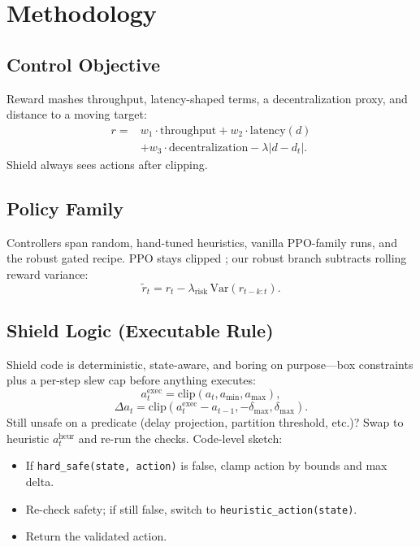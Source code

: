 \section{Methodology}

\subsection{Control Objective}

Reward mashes throughput, latency-shaped terms, a decentralization proxy, and distance to a moving target:
\[
\begin{aligned}
r ={}& w_1 \cdot \text{throughput} + w_2 \cdot \text{latency}(d) \\
&+ w_3 \cdot \text{decentralization} - \lambda |d - d_t|.
\end{aligned}
\]
Shield always sees actions after clipping.

\subsection{Policy Family}

Controllers span random, hand-tuned heuristics, vanilla PPO-family runs, and the robust gated recipe. PPO stays clipped \cite{schulman2017ppo}; our robust branch subtracts rolling reward variance:
\[
\tilde r_t = r_t - \lambda_{\mathrm{risk}}\,\mathrm{Var}(r_{t-k:t}).
\]

\subsection{Shield Logic (Executable Rule)}

Shield code is deterministic, state-aware, and boring on purpose---box constraints plus a per-step slew cap before anything executes:
\[
a^{\mathrm{exec}}_t=\mathrm{clip}(a_t, a_{\min}, a_{\max}),
\]
\[
\Delta a_t=\mathrm{clip}(a^{\mathrm{exec}}_t-a_{t-1},-\delta_{\max},\delta_{\max}).
\]
Still unsafe on a predicate (delay projection, partition threshold, etc.)? Swap to heuristic $a_t^{\mathrm{heur}}$ and re-run the checks. Code-level sketch:
\begin{itemize}
    \item If \texttt{hard\_safe(state, action)} is false, clamp action by bounds and max delta.
    \item Re-check safety; if still false, switch to \texttt{heuristic\_action(state)}.
    \item Return the validated action.
\end{itemize}


